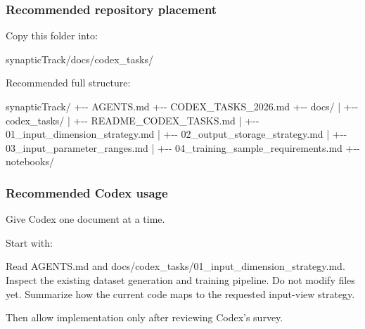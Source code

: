 \documentclass[
]{article}
\newenvironment{Shaded}{}{}
\newcommand{\NormalTok}[1]{#1}
\begin{document}
\hypertarget{recommended-repository-placement}{%
\subsubsection{Recommended repository
placement}\label{recommended-repository-placement}}

Copy this folder into:

\begin{Shaded}
\begin{Highlighting}[]
\NormalTok{synapticTrack/docs/codex\_tasks/}
\end{Highlighting}
\end{Shaded}

Recommended full structure:

\begin{Shaded}
\begin{Highlighting}[]
\NormalTok{synapticTrack/}
\NormalTok{+{-}{-} AGENTS.md}
\NormalTok{+{-}{-} CODEX\_TASKS\_2026.md}
\NormalTok{+{-}{-} docs/}
\NormalTok{|   +{-}{-} codex\_tasks/}
\NormalTok{|       +{-}{-} README\_CODEX\_TASKS.md}
\NormalTok{|       +{-}{-} 01\_input\_dimension\_strategy.md}
\NormalTok{|       +{-}{-} 02\_output\_storage\_strategy.md}
\NormalTok{|       +{-}{-} 03\_input\_parameter\_ranges.md}
\NormalTok{|       +{-}{-} 04\_training\_sample\_requirements.md}
\NormalTok{+{-}{-} notebooks/}
\end{Highlighting}
\end{Shaded}

\hypertarget{recommended-codex-usage}{%
\subsubsection{Recommended Codex usage}\label{recommended-codex-usage}}

Give Codex one document at a time.

Start with:

\begin{Shaded}
\begin{Highlighting}[]
\NormalTok{Read AGENTS.md and docs/codex\_tasks/01\_input\_dimension\_strategy.md.}
\NormalTok{Inspect the existing dataset generation and training pipeline.}
\NormalTok{Do not modify files yet. Summarize how the current code maps to the requested input{-}view strategy.}
\end{Highlighting}
\end{Shaded}

Then allow implementation only after reviewing Codex's survey.
\end{document}
